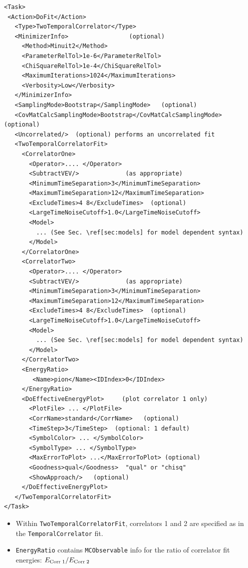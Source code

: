 \documentclass[12pt]{article}
\newcommand{\vb}{\texttt}
\begin{document}
\begin{Verbatim}[commandchars=\\\[\]]
<Task>
 <Action>DoFit</Action>
   <Type>TwoTemporalCorrelator</Type>
   <MinimizerInfo>                 (optional)
     <Method>Minuit2</Method>
     <ParameterRelTol>1e-6</ParameterRelTol>
     <ChiSquareRelTol>1e-4</ChiSquareRelTol>
     <MaximumIterations>1024</MaximumIterations>
     <Verbosity>Low</Verbosity>
   </MinimizerInfo>
   <SamplingMode>Bootstrap</SamplingMode>   (optional)
   <CovMatCalcSamplingMode>Bootstrap</CovMatCalcSamplingMode> (optional)
   <Uncorrelated/>  (optional) performs an uncorrelated fit
   <TwoTemporalCorrelatorFit>
     <CorrelatorOne>
       <Operator>.... </Operator>
       <SubtractVEV/>             (as appropriate)
       <MinimumTimeSeparation>3</MinimumTimeSeparation>
       <MaximumTimeSeparation>12</MaximumTimeSeparation>
       <ExcludeTimes>4 8</ExcludeTimes>  (optional)
       <LargeTimeNoiseCutoff>1.0</LargeTimeNoiseCutoff>
       <Model>
         ... (See Sec. \ref[sec:models] for model dependent syntax)
       </Model>
     </CorrelatorOne>
     <CorrelatorTwo>
       <Operator>.... </Operator>
       <SubtractVEV/>             (as appropriate)
       <MinimumTimeSeparation>3</MinimumTimeSeparation>
       <MaximumTimeSeparation>12</MaximumTimeSeparation>
       <ExcludeTimes>4 8</ExcludeTimes>  (optional)
       <LargeTimeNoiseCutoff>1.0</LargeTimeNoiseCutoff>
       <Model>
         ... (See Sec. \ref[sec:models] for model dependent syntax)
       </Model>
     </CorrelatorTwo>
     <EnergyRatio>
        <Name>pion</Name><IDIndex>0</IDIndex>
     </EnergyRatio>
     <DoEffectiveEnergyPlot>     (plot correlator 1 only)
       <PlotFile> ... </PlotFile>
       <CorrName>standard</CorrName>   (optional)
       <TimeStep>3</TimeStep>  (optional: 1 default)
       <SymbolColor> ... </SymbolColor>
       <SymbolType> ... </SymbolType>
       <MaxErrorToPlot> ...</MaxErrorToPlot> (optional)
       <Goodness>qual</Goodness>  "qual" or "chisq"
       <ShowApproach/>   (optional)
     </DoEffectiveEnergyPlot>
   </TwoTemporalCorrelatorFit>
</Task>
\end{Verbatim}
\begin{itemize}
\item Within \vb{TwoTemporalCorrelatorFit}, correlators 1 and 2 are 
specified as in the \newline
\vb{TemporalCorrelator} fit.
\item \vb{EnergyRatio} contains \vb{MCObservable} info for the ratio of 
correlator fit energies:\newline
  $E_{{\rm Corr}\;1} / E_{{\rm Corr}\;2}$
\end{itemize}
\end{document}
